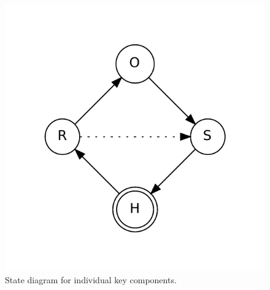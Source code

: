\documentclass[twoside,english]{paper}
\renewcommand{\setminus}{\mathrel{\backslash}}
\begin{document}

\begin{figure}[t]
	\centering
	\includegraphics[scale=0.5]{states.pdf}
	\caption{State diagram for individual key components.}
	\label{fig:states}
\end{figure}
\end{document}
